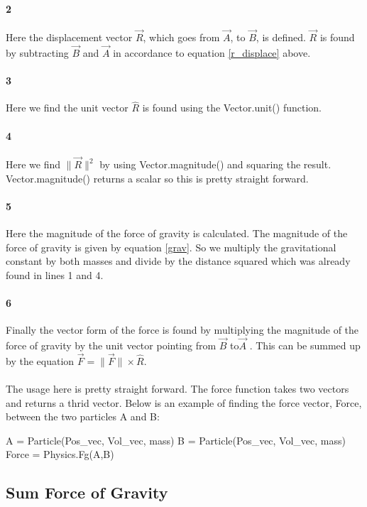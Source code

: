 \documentclass[15pt]{report}
\begin{document}
\paragraph{2} Here the displacement vector $\vec{R}$, which goes from $\vec{A}$, to $\vec{B}$, is defined. $\vec{R}$ is found by  subtracting $\vec{B}$ and $\vec{A}$ in accordance to equation \ref{r_displace} above.
\paragraph{3} Here we find the unit vector $\hat{R}$ is found using the Vector.unit() function.
\paragraph{4} Here we find $\| \vec{R} \| ^2$ by using Vector.magnitude() and squaring the result. Vector.magnitude() returns a scalar so this is pretty straight forward.
\paragraph{5} Here the magnitude of the force of gravity is calculated. The magnitude of the force of gravity is given by equation \ref{grav}. So we multiply the gravitational constant by both masses and divide by the distance squared which was already found in lines 1 and 4.
\paragraph{6} Finally the vector form of the force is found by multiplying the magnitude of the force of gravity by the unit vector pointing from $\vec{B}$ to$\vec{A}$ . This can be summed up by the equation $\vec{F} = \|\vec{F}\| \times \hat{R}$.

\paragraph{} The usage here is pretty straight forward. The force function takes two vectors and returns a thrid vector. 
Below is an example of finding the force vector, Force, between the two particles A and B:

\begin{code}
	A = Particle(Pos_vec, Vol_vec, mass)
	B = Particle(Pos_vec, Vol_vec, mass)
	Force = Physics.Fg(A,B)
\end{code}

\subsection{Sum Force of Gravity}
\end{document}
